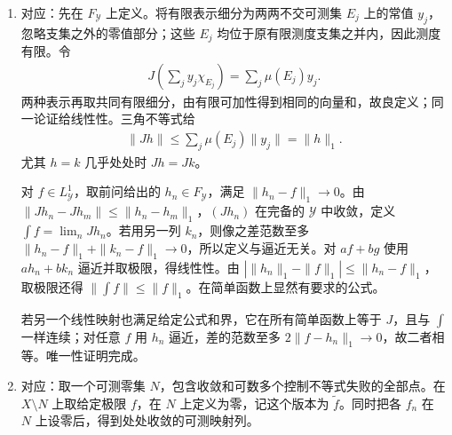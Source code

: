 \documentclass[../../main.tex]{subfiles}
\begin{document}
\begin{solution}
\begin{enumerate}
对固定 $j$，有限截断 $h_{j,N}=\sum_{n=1}^Ny_n\chi_{E_{nj}}$ 属于 $F_{\mathcal Y}$，并且
\begin{align*}
\|g_j-h_{j,N}\|_1=\sum_{n>N}\|y_n\|\mu(E_{nj})\longrightarrow0,
\end{align*}
因为全部非负项之和等于 $\|g_j\|_1<\infty$。选 $N_j$ 使该尾和小于 $2^{-j}$，令 $h_j=h_{j,N_j}$。于是 $\|h_j-f\|_1\le2^{-j}+\|f\|_1/(j-1)\to0$。另一方面，单调收敛定理给
\begin{align*}
\int\sum_{j=2}^{\infty}\|g_j-h_j\|\,\mathrm d\mu
=\sum_{j=2}^{\infty}\|g_j-h_j\|_1<\infty.
\end{align*}
故此误差级数几乎处处有限，特别其项趋零；结合 $g_j\to f$ 逐点得 $h_j\to f$ 几乎处处。重新从 $1$ 编号即为所求序列。
\item 对应：先在 $F_{\mathcal Y}$ 上定义。将有限表示细分为两两不交可测集 $E_j$ 上的常值 $y_j$，忽略支集之外的零值部分；这些 $E_j$ 均位于原有限测度支集之并内，因此测度有限。令
\begin{align*}
J\left(\sum_jy_j\chi_{E_j}\right)=\sum_j\mu(E_j)y_j.
\end{align*}
两种表示再取共同有限细分，由有限可加性得到相同的向量和，故良定义；同一论证给线性性。三角不等式给
\begin{align*}
\|Jh\|\le\sum_j\mu(E_j)\|y_j\|=\|h\|_1.
\end{align*}
尤其 $h=k$ 几乎处处时 $Jh=Jk$。

对 $f\in L_{\mathcal Y}^1$，取前问给出的 $h_n\in F_{\mathcal Y}$，满足 $\|h_n-f\|_1\to0$。由 $\|Jh_n-Jh_m\|\le\|h_n-h_m\|_1$，$(Jh_n)$ 在完备的 $\mathcal Y$ 中收敛，定义 $\int f=\lim_nJh_n$。若用另一列 $k_n$，则像之差范数至多 $\|h_n-f\|_1+\|k_n-f\|_1\to0$，所以定义与逼近无关。对 $af+bg$ 使用 $ah_n+bk_n$ 逼近并取极限，得线性性。由 $|\|h_n\|_1-\|f\|_1|\le\|h_n-f\|_1$，取极限还得 $\|\int f\|\le\|f\|_1$。在简单函数上显然有要求的公式。

若另一个线性映射也满足给定公式和界，它在所有简单函数上等于 $J$，且与 $\int$ 一样连续；对任意 $f$ 用 $h_n$ 逼近，差的范数至多 $2\|f-h_n\|_1\to0$，故二者相等。唯一性证明完成。
\item 对应：取一个可测零集 $N$，包含收敛和可数多个控制不等式失败的全部点。在 $X\setminus N$ 上取给定极限 $f$，在 $N$ 上定义为零，记这个版本为 $\widetilde f$。同时把各 $f_n$ 在 $N$ 上设零后，得到处处收敛的可测映射列。


\end{enumerate}
\end{solution}
\end{document}
